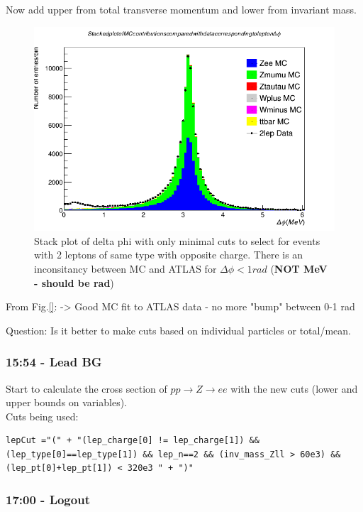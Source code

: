 Now add upper from total transverse momentum and lower from invariant mass.
\begin{figure}[h!]
    \centering
	\includegraphics[width=0.85\linewidth]{plots/23-02-2021/All-stack-fast_delta-phi_minimal-cuts_0-6_23-02-21_15-30.png}
	\caption{Stack plot of delta phi with only minimal cuts to select for events with 2 leptons of same type with opposite charge.  There is an inconsitancy between MC and ATLAS for $\Delta \phi < 1 rad$ (\textbf{NOT MeV - should be rad})}\label{fig:All-stack-fast_delta-phi_minimal-cuts_0-6_23-02-21_15-30}
\end{figure}
From Fig.\ref{}:
-> Good MC fit to ATLAS data - no more "bump" between 0-1 rad

Question: Is it better to make cuts based on individual particles or total/mean.
 
\subsubsection*{15:54 - Lead BG}
Start to calculate the cross section of $pp \rightarrow Z \rightarrow ee$ with the new cuts (lower and upper bounds on variables).
\\
Cuts being used:
\begin{lstlisting}
lepCut ="(" + "(lep_charge[0] != lep_charge[1]) && (lep_type[0]==lep_type[1]) && lep_n==2 && (inv_mass_Zll > 60e3) && (lep_pt[0]+lep_pt[1]) < 320e3 " + ")"
\end{lstlisting}

\subsubsection*{17:00 - Logout}